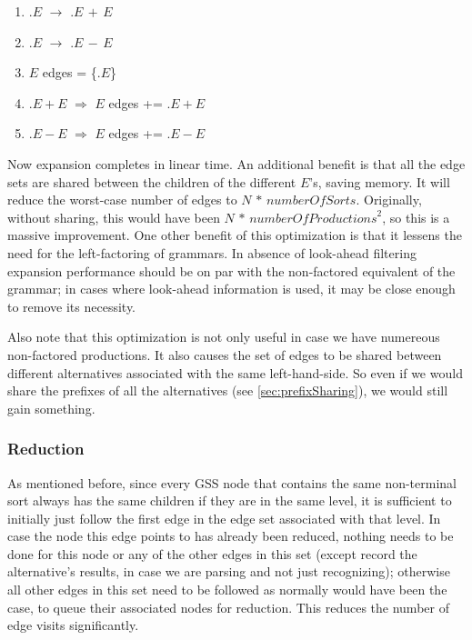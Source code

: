 \documentclass[a4paper,10pt]{article}
\begin{document}
\begin{enumerate}
 \setlength{\itemsep}{0pt}
 \setlength{\parskip}{0pt}
 \setlength{\parsep}{0pt}
 
 \item $.E$ $\rightarrow$ $.E\,+\,E$
 \item $.E$ $\rightarrow$ $.E\,-\,E$
 \item $E$ edges = \{$.E$\}
 \item $.E+E$ $\Rightarrow$ $E$ edges += $.E+E$
 \item $.E-E$ $\Rightarrow$ $E$ edges += $.E-E$
\end{enumerate}
Now expansion completes in linear time. An additional benefit is that all the edge sets are shared between the children of the different $E$'s, saving memory. It will reduce the worst-case number of edges to $N\,*\,\mathit{numberOfSorts}$. Originally, without sharing, this would have been $N\,*\,\mathit{numberOfProductions}^2$, so this is a massive improvement. One other benefit of this optimization is that it lessens the need for the left-factoring of grammars. In absence of look-ahead filtering expansion performance should be on par with the non-factored equivalent of the grammar; in cases where look-ahead information is used, it may be close enough to remove its necessity.

Also note that this optimization is not only useful in case we have numereous non-factored productions. It also causes the set of edges to be shared between different alternatives associated with the same left-hand-side. So even if we would share the prefixes of all the alternatives (see \ref{sec:prefixSharing}), we would still gain something.

\subsubsection{Reduction}
\label{subsec:edgeVisitOptimization}
As mentioned before, since every GSS node that contains the same non-terminal sort always has the same children if they are in the same level, it is sufficient to initially just follow the first edge in the edge set associated with that level. In case the node this edge points to has already been reduced, nothing needs to be done for this node or any of the other edges in this set (except record the alternative's results, in case we are parsing and not just recognizing); otherwise all other edges in this set need to be followed as normally would have been the case, to queue their associated nodes for reduction. This reduces the number of edge visits significantly.
\end{document}
